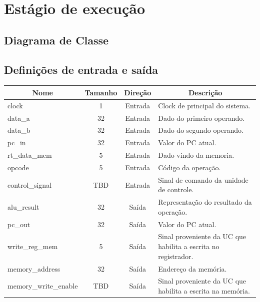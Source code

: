 \section{Estágio de execução}
	\subsection{Diagrama de Classe}
  \begin{figure}[h]
    
  \end{figure}
		
		\subsection{Definições de entrada e saída}
		
	\begin{center}
		\begin{longtable}[pos]{| l | c | c | m{7cm} |} \hline
			\multicolumn{1}{|c|}{\cellcolor[gray]{0.9}\textbf{Nome}} & 
			\multicolumn{1}{c|}{\cellcolor[gray]{0.9}\textbf{Tamanho}} & 
			\multicolumn{1}{c|}{\cellcolor[gray]{0.9}\textbf{Direção}} &
			\multicolumn{1}{c|}{\cellcolor[gray]{0.9}\textbf{Descrição}} \\ \hline
			\endhead
			\hline
			\endlastfoot
			
			clock & 1 & Entrada & Clock de principal do sistema.\\ \hline
			data\_a & 32 & Entrada & Dado do primeiro operando. \\ \hline
			data\_b & 32 & Entrada & Dado do segundo operando. \\ \hline
			pc\_in & 32 & Entrada & Valor do PC atual. \\ \hline
			rt\_data\_mem & 5 & Entrada & Dado vindo da memoria. \\ \hline
			opcode & 5 & Entrada & Código da operação.\\ \hline
			control\_signal & TBD & Entrada & Sinal de comando da unidade de controle. \\ \hline
			alu\_result & 32 & Saída & Representação do resultado da operação. \\ \hline
			pc\_out & 32 & Saída & Valor do PC atual. \\ \hline
			write\_reg\_mem & 5 & Saída & Sinal proveniente da UC que habilita a escrita no registrador. \\ \hline
			memory\_address & 32 & Saída & Endereço da memória. \\ \hline
			memory\_write\_enable & TBD & Saída & Sinal proveniente da UC que habilita a escrita na memória.
			
		\end{longtable}
	\end{center}
	
